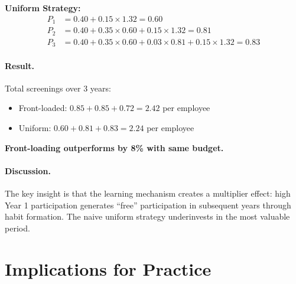 \textbf{Uniform Strategy:}
\begin{align}
P_1 &= 0.40 + 0.15 \times 1.32 = 0.60 \\
P_2 &= 0.40 + 0.35 \times 0.60 + 0.15 \times 1.32 = 0.81 \\
P_3 &= 0.40 + 0.35 \times 0.60 + 0.03 \times 0.81 + 0.15 \times 1.32 = 0.83
\end{align}

\paragraph{Result.} Total screenings over 3 years:
\begin{itemize}
\item Front-loaded: $0.85 + 0.85 + 0.72 = 2.42$ per employee
\item Uniform: $0.60 + 0.81 + 0.83 = 2.24$ per employee
\end{itemize}

\textbf{Front-loading outperforms by 8\% with same budget.}

\paragraph{Discussion.} The key insight is that the learning mechanism creates a
multiplier effect: high Year 1 participation generates ``free'' participation in
subsequent years through habit formation. The naive uniform strategy underinvests
in the most valuable period.


\section{Implications for Practice}
\label{sec:hf-practice}

